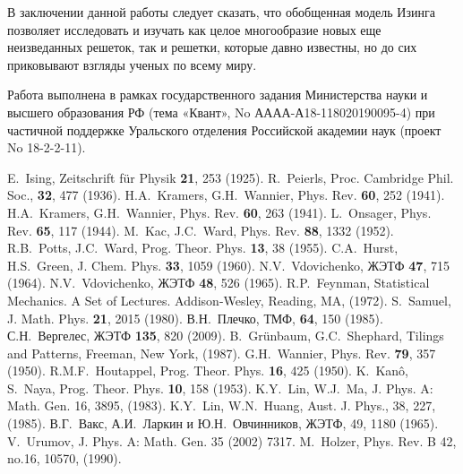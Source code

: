 \documentclass[utf8,12pt]{jetp}
\begin{document}
В заключении данной работы следует сказать, что обобщенная модель Изинга позволяет исследовать и изучать как целое многообразие новых еще неизведанных решеток, так и решетки, которые давно известны, но до сих приковывают взгляды ученых по всему миру.
		
Работа выполнена в рамках государственного задания Министерства науки и высшего образования РФ (тема «Квант», No АААА-А18-118020190095-4) при частичной поддержке Уральского отделения Российской академии наук (проект No 18-2-2-11).
	
	
\begin{references}

 E.~Ising, Zeitschrift für Physik \textbf{21}, 253 (1925).
 R.~Peierls, Proc. Cambridge Phil. Soc., \textbf{32}, 477 (1936).
  H.A.~Kramers, G.H.~Wannier, Phys. Rev. \textbf{60}, 252 (1941).
  H.A.~Kramers, G.H.~Wannier, Phys. Rev. \textbf{60}, 263 (1941).
  L.~Onsager, Phys. Rev. \textbf{65}, 117 (1944).
 M.~Kac, J.C.~Ward, Phys. Rev. \textbf{88}, 1332 (1952).
 R.B.~Potts, J.C.~Ward, Prog. Theor. Phys. \textbf{13}, 38 (1955).
 C.A.~Hurst, H.S.~Green, J. Chem. Phys. \textbf{33}, 1059 (1960).
 N.V.~Vdovichenko, ЖЭТФ \textbf{47}, 715 (1964).
 N.V.~Vdovichenko, ЖЭТФ \textbf{48}, 526 (1965).
 R.P.~Feynman, Statistical Mechanics. A Set of Lectures. Addison-Wesley, Reading, MA, (1972).
 S.~Samuel, J. Math. Phys. \textbf{21}, 2015 (1980).
 В.Н.~Плечко, ТМФ, \textbf{64}, 150 (1985).
 С.Н.~Вергелес, ЖЭТФ \textbf{135}, 820 (2009).
 B.~Grünbaum, G.C.~Shephard, Tilings and Patterns, Freeman, New York, (1987).
  G.H.~Wannier, Phys. Rev. \textbf{79}, 357 (1950).
 R.M.F.~Houtappel, Prog. Theor. Phys. \textbf{16}, 425 (1950).
  K.~Kanô, S.~Naya, Prog. Theor. Phys. \textbf{10}, 158 (1953).
 K.Y.~Lin, W.J.~Ma, J. Phys. A: Math. Gen. 16, 3895, (1983).
 K.Y.~Lin, W.N.~Huang, Aust. J. Phys., 38, 227, (1985).
 В.Г.~Вакс, А.И.~Ларкин и Ю.Н.~Овчинников, ЖЭТФ, 49, 1180 (1965).
 V.~Urumov, J. Phys. A: Math. Gen. 35 (2002) 7317.
 M.~Holzer, Phys. Rev. B 42, no.16, 10570, (1990).

\end{references}
\end{document}
